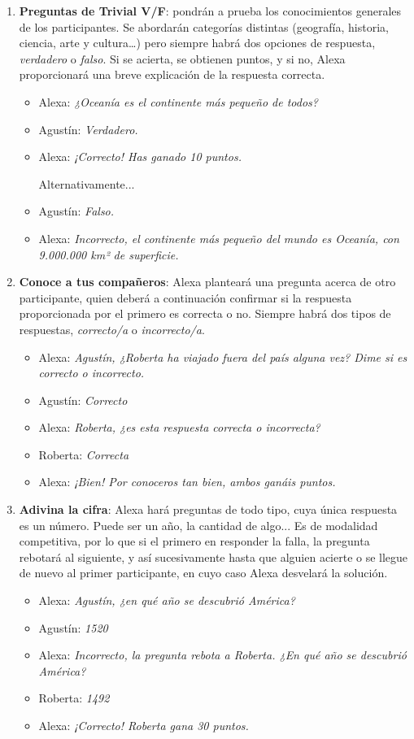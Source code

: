 \begin{enumerate}
	\item \textbf{Preguntas de Trivial V/F}: pondrán a prueba los conocimientos generales de los participantes. Se abordarán categorías distintas (geografía, historia, ciencia, arte y cultura…) pero siempre habrá dos opciones de respuesta, \textit{verdadero} o \textit{falso}. Si se acierta, se obtienen puntos, y si no, Alexa proporcionará una breve explicación de la respuesta correcta.
	\begin{itemize}
		\item Alexa: \textit{¿Oceanía es el continente más pequeño de todos?}
		\item Agustín: \textit{Verdadero.}
		\item Alexa: \textit{¡Correcto! Has ganado 10 puntos.}
		
		Alternativamente...
		\item Agustín: \textit{Falso.}
		\item Alexa: \textit{Incorrecto, el continente más pequeño del mundo es Oceanía, con 9.000.000 km² de superficie.}
	\end{itemize}
	
	\item \textbf{Conoce a tus compañeros}: Alexa planteará una pregunta acerca de otro participante, quien deberá a continuación confirmar si la respuesta proporcionada por el primero es correcta o no. Siempre habrá dos tipos de respuestas, \textit{correcto/a} o \textit{incorrecto/a}.
	\begin{itemize}
		\item Alexa: \textit{Agustín, ¿Roberta ha viajado fuera del país alguna vez? Dime si es correcto o incorrecto.}
		\item Agustín: \textit{Correcto}
		\item Alexa: \textit{Roberta, ¿es esta respuesta correcta o incorrecta?}
		\item Roberta: \textit{Correcta}
		\item Alexa: \textit{¡Bien! Por conoceros tan bien, ambos ganáis puntos.}
	\end{itemize}
	
	\item \textbf{Adivina la cifra}: Alexa hará preguntas de todo tipo, cuya única respuesta es un número. Puede ser un año, la cantidad de algo... Es de modalidad competitiva, por lo que si el primero en responder la falla, la pregunta rebotará al siguiente, y así sucesivamente hasta que alguien acierte o se llegue de nuevo al primer participante, en cuyo caso Alexa desvelará la solución.
	\begin{itemize}
		\item Alexa: \textit{Agustín, ¿en qué año se descubrió América?}
		\item Agustín: \textit{1520}
		\item Alexa: \textit{Incorrecto, la pregunta rebota a Roberta. ¿En qué año se descubrió América?}
		\item Roberta: \textit{1492}
		\item Alexa: \textit{¡Correcto! Roberta gana 30 puntos.}
	\end{itemize}
	

\end{enumerate}
